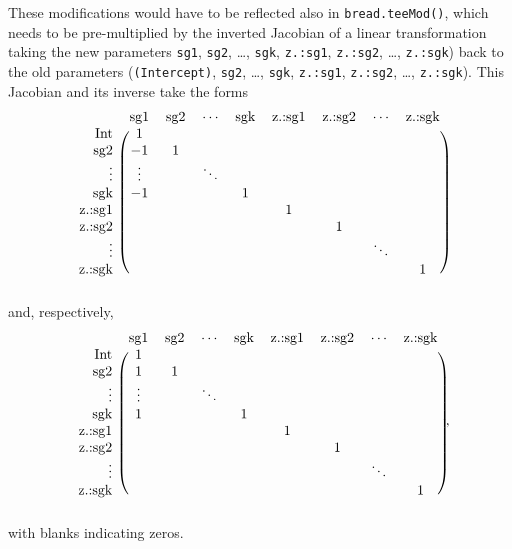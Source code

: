 \documentclass{article}
\begin{document}
These modifications would have to be reflected also in
\texttt{bread.teeMod()}, which needs to be pre-multiplied by the inverted
Jacobian of a linear transformation
taking the new parameters \texttt{sg1}, \texttt{sg2}, \ldots,
\texttt{sgk}, \texttt{z.:sg1}, \texttt{z.:sg2}, \ldots,
\texttt{z.:sgk}) back to the old parameters (\texttt{(Intercept)}, \texttt{sg2}, \ldots,
\texttt{sgk}, \texttt{z.:sg1}, \texttt{z.:sg2}, \ldots,
\texttt{z.:sgk}).  This Jacobian and its inverse take the forms
\begin{equation*}
  \begin{blockarray}{rcccccccc}
& \text{sg1}& \text{sg2} & \cdots & \text{sgk} & \text{z.:sg1} & \text{z.:sg2}& \cdots & \text{z.:sgk} \\ 
    \begin{block}{r(cccccccc)}
         \text{Int} &1  &&&&&&&\\
    \text{sg2}&-1  &1&&&&&&\\
    \vdots& \vdots &&\ddots&&&&&\\
    \text{sgk}&-1 &&&1&&&&\\
    \text{z.:sg1}&  &&&&1&&&\\
    \text{z.:sg2}&  &&&&&1&&\\
    \vdots&  &&&&&&\ddots&\\
    \text{z.:sgk}& &&&&&&&1\\
    \end{block}
  \end{blockarray}
\end{equation*}
and, respectively, 
\begin{equation*}
  \begin{blockarray}{rcccccccc}
& \text{sg1}& \text{sg2} & \cdots & \text{sgk} & \text{z.:sg1} & \text{z.:sg2}& \cdots & \text{z.:sgk} \\ 
    \begin{block}{r(cccccccc)}
         \text{Int} &1  &&&&&&&\\
    \text{sg2}&1  &1&&&&&&\\
    \vdots&\vdots  &&\ddots&&&&&\\
    \text{sgk}&1 &&&1&&&&\\
    \text{z.:sg1}&  &&&&1&&&\\
    \text{z.:sg2}&  &&&&&1&&\\
    \vdots&  &&&&&&\ddots &\\
    \text{z.:sgk}& &&&&&&&1\\
    \end{block}
  \end{blockarray},
\end{equation*}
with blanks indicating zeros.
\end{document}

